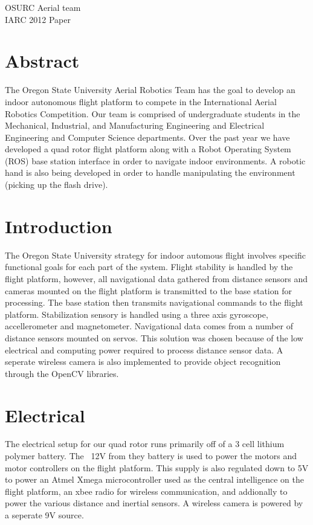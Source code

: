 \documentclass[12pt,letterpaper]{article}
\begin{document}
\begin{titlepage}
    \vspace*{4cm}
    \begin{center}
    {\huge
        OSURC Aerial team\\[1cm]
    }
    {\large
	IARC 2012 Paper\\
    }

    \end{center}
    \vfill
\end{titlepage}
\section{Abstract}
The Oregon State University Aerial Robotics Team has the goal to develop
an indoor autonomous flight platform to compete in the International Aerial
Robotics Competition. Our team is comprised of undergraduate students in the
Mechanical, Industrial, and Manufacturing Engineering and Electrical Engineering
and Computer Science departments. Over the past year we have developed a quad
rotor flight platform along with a Robot Operating System (ROS) base station
interface in order to navigate indoor environments. A robotic hand is also
being developed in order to handle manipulating the environment (picking up the
flash drive).

\section{Introduction}
	The Oregon State University strategy for indoor automous flight involves
specific functional goals for each part of the system. Flight stability is
handled by the flight platform, however, all navigational data gathered from
distance sensors and cameras mounted on the flight platform is transmitted to
the base station for processing. The base station then transmits navigational
commands to the flight platform.
	Stabilization sensory is handled using a three axis gyroscope, 
accellerometer and magnetometer. Navigational data comes from a number of
distance sensors mounted on servos. This solution was chosen because of the
low electrical and computing power required to process distance sensor data.
A seperate wireless camera is also implemented to provide object recognition
through the OpenCV libraries.

\section{Electrical}
The electrical setup for our quad rotor runs primarily off of a 3 cell
lithium polymer battery. The ~12V from they battery is used to power the motors
and motor controllers on the flight platform. This supply is also regulated down
to 5V to power an Atmel Xmega microcontroller used as the central intelligence
on the flight platform, an xbee radio for wireless communication, and 
addionally to power the various distance and inertial sensors. A wireless camera
is powered by a seperate 9V source.
\end{document}
